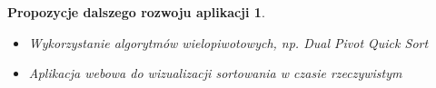 \begin{frame}[squeeze]{}

	\newtheorem*{futurework*}{Propozycje dalszego rozwoju aplikacji}
	\begin{futurework*}
		\begin{itemize}
			\item Wykorzystanie algorytmów wielopiwotowych, np. Dual Pivot Quick Sort
			\item Aplikacja webowa do wizualizacji sortowania w czasie rzeczywistym
		\end{itemize}
	\end{futurework*}

\end{frame}